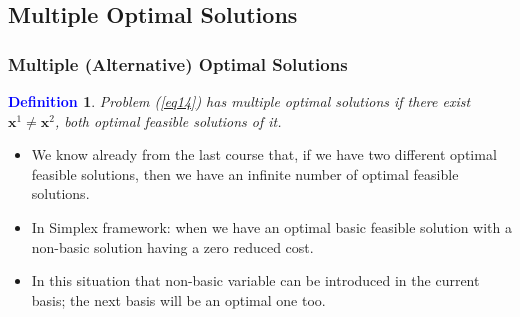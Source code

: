 \documentclass{beamer}
\theoremstyle{plain}
\newcommand{\git}[1]{\textcolor{grena}{\it #1}}
\newtheorem{deff}{\bf \textcolor{blue}{Definition}}[subsection]
\def\x{{\mathrm x}}
\def\x{{\mathbf x}}
\begin{document}
\subsection{Multiple Optimal Solutions}
\begin{frame}\frametitle{Multiple (Alternative) Optimal Solutions}
\justifying

\begin{mdframed}[style=myf]
\begin{deff}
\justifying
Problem (\ref{eq14}) has \git{multiple optimal solutions} if there exist $ \x^1 \ne \x^2 $, both optimal feasible solutions of it.
\end{deff}
\end{mdframed}

\begin{itemize}
\justifying

\item We know already from the last course that, if we have two different optimal feasible solutions, then we have  an infinite number of optimal feasible solutions.

\item In Simplex framework: when we have an optimal basic feasible solution with a non-basic solution having a zero reduced cost.

\item In this situation that non-basic variable can be introduced in the current basis; the next basis will be an optimal one too.

\end{itemize}

\end{frame}
\end{document}
